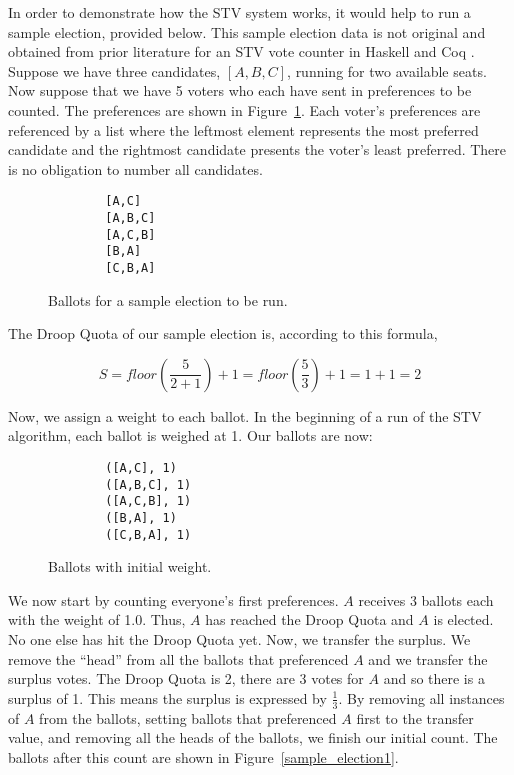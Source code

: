 In order to demonstrate how the STV system works, it would help to run a sample
election, provided below. This sample election data is not original and obtained
from prior literature for an STV vote counter in Haskell and Coq
\cite{stv_haskell}. Suppose we have three candidates, $[A, B, C]$, running for
two available seats. Now suppose that we have 5 voters who each have sent in
preferences to be counted. The preferences are shown in
Figure~\ref{sample_election}. Each voter's preferences are referenced by a list
where the leftmost element represents the most preferred candidate and the
rightmost candidate presents the voter's least preferred. There is no obligation
to number all candidates. 


\begin{figure}[ht!!!!!!!!]
    \caption{Ballots for a sample election to be run. }
    \label{sample_election}
    \begin{lstlisting}
        [A,C]
        [A,B,C]
        [A,C,B]
        [B,A]
        [C,B,A]
    \end{lstlisting}
\end{figure}

The Droop Quota of our sample election is, according to this formula, 

$$
S = floor(\frac{5}{2 + 1}) + 1 = floor(\frac{5}{3}) + 1 = 1 + 1 = 2
$$

Now, we assign a weight to each ballot. In the beginning of a run of the STV
algorithm, each ballot is weighed at 1. Our ballots are now: 

\begin{figure}[ht!!!!!!!!]
    \caption{Ballots with initial weight.}
    \label{sample_election0}
    \begin{lstlisting}
        ([A,C], 1)
        ([A,B,C], 1)
        ([A,C,B], 1)
        ([B,A], 1)
        ([C,B,A], 1)
    \end{lstlisting}
\end{figure}

We now start by counting everyone's first preferences. $A$ receives 3 ballots
each with the weight of 1.0. Thus, $A$ has reached the Droop Quota and $A$ is
elected. No one else has hit the Droop Quota yet. Now, we transfer the surplus.
We remove the ``head'' from all the ballots that preferenced $A$ and we transfer
the surplus votes. The Droop Quota is 2, there are 3 votes for $A$ and so there
is a surplus of 1. This means the surplus is expressed by $\frac{1}{3}$. By
removing all instances of $A$ from the ballots, setting ballots that preferenced
$A$ first to the transfer value, and removing all the heads of the ballots, we
finish our initial count. The ballots after this count are shown in
Figure~\ref{sample_election1}. 

